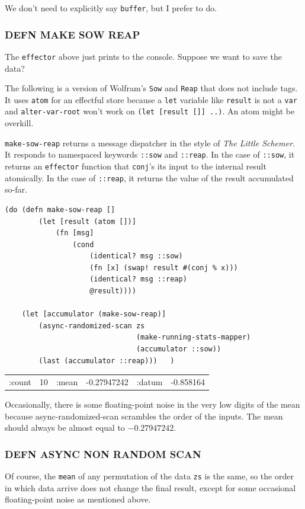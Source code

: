\documentclass[10pt,oneside,x11names]{article}
\begin{document}
We don't need to explicitly say \texttt{buffer}, but I prefer to do.

\subsubsection{DEFN MAKE SOW REAP}
\label{sow-and-reap}
The \texttt{effector} above just prints to the console. Suppose we want to save
the data?

The following is a version of Wolfram's \texttt{Sow} and \texttt{Reap} that does not
include tags. It uses \texttt{atom} for an effectful store because a \texttt{let}
variable like \texttt{result} is not a \texttt{var} and \texttt{alter-var-root} won't work on
\texttt{(let [result []] ..)}. An atom might be overkill.

\texttt{make-sow-reap} returns a message dispatcher in the style of \emph{The Little
Schemer}. It responds to namespaced keywords \texttt{::sow} and \texttt{::reap}. In
the case of \texttt{::sow}, it returns an \texttt{effector} function that \texttt{conj}'s its
input to the internal result atomically. In the case of \texttt{::reap}, it
returns the value of the result accumulated so-far.

\begin{verbatim}
(do (defn make-sow-reap []
        (let [result (atom [])]
            (fn [msg]
                (cond
                    (identical? msg ::sow)
                    (fn [x] (swap! result #(conj % x)))
                    (identical? msg ::reap)
                    @result))))

    (let [accumulator (make-sow-reap)]
        (async-randomized-scan zs
                               (make-running-stats-mapper)
                               (accumulator ::sow))
        (last (accumulator ::reap)))   )
\end{verbatim}

\begin{center}
\begin{tabular}{lrlrlr}
:count & 10 & :mean & -0.27947242 & :datum & -0.858164\\
\end{tabular}
\end{center}

Occasionally, there is some floating-point noise in the very low digits
of the mean because async-randomized-scan scrambles the order of the
inputs. The mean should always be almost equal to \(-0.27947242\).

\subsubsection{DEFN ASYNC NON RANDOM SCAN}
\label{not-randomized}
Of course, the \texttt{mean} of any permutation of the data \texttt{zs} is the same,
so the order in which data arrive does not change the final result,
except for some occasional floating-point noise as mentioned above.
\end{document}
